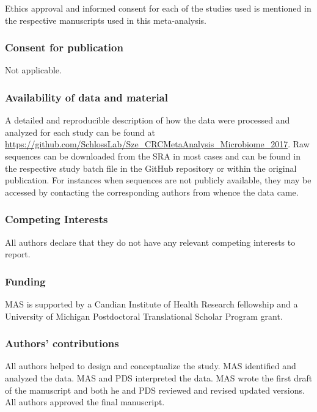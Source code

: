 \documentclass[12pt,]{article}
\begin{document}
Ethics approval and informed consent for each of the studies used is
mentioned in the respective manuscripts used in this meta-analysis.

\subsubsection{Consent for publication}\label{consent-for-publication}

Not applicable.

\subsubsection{Availability of data and
material}\label{availability-of-data-and-material}

A detailed and reproducible description of how the data were processed
and analyzed for each study can be found at
\url{https://github.com/SchlossLab/Sze_CRCMetaAnalysis_Microbiome_2017}.
Raw sequences can be downloaded from the SRA in most cases and can be
found in the respective study batch file in the GitHub repository or
within the original publication. For instances when sequences are not
publicly available, they may be accessed by contacting the corresponding
authors from whence the data came.

\subsubsection{Competing Interests}\label{competing-interests}

All authors declare that they do not have any relevant competing
interests to report.

\subsubsection{Funding}\label{funding}

MAS is supported by a Candian Institute of Health Research fellowship
and a University of Michigan Postdoctoral Translational Scholar Program
grant.

\subsubsection{Authors' contributions}\label{authors-contributions}

All authors helped to design and conceptualize the study. MAS identified
and analyzed the data. MAS and PDS interpreted the data. MAS wrote the
first draft of the manuscript and both he and PDS reviewed and revised
updated versions. All authors approved the final manuscript.
\end{document}
